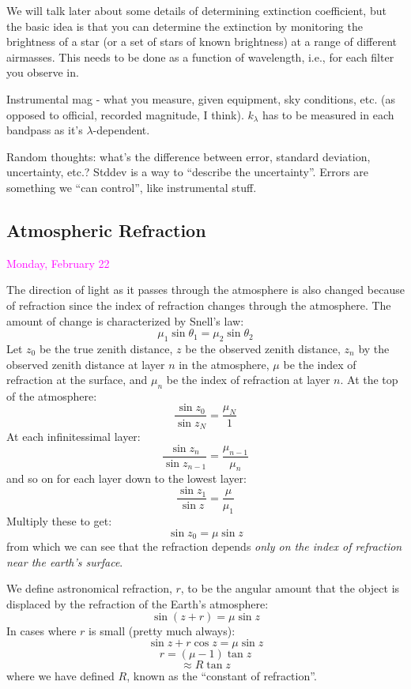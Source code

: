 \documentclass[12pt]{article}
\begin{document}
We will talk later about some details of determining extinction
coefficient, but the basic idea is that you can determine the
extinction by monitoring the brightness of a star (or a set of stars
of known brightness) at a range of different airmasses. This needs to
be done as a function of wavelength, i.e., for each filter you observe
in.

\textcolor{myBlue}{Instrumental mag - what you measure, given
    equipment, sky conditions, etc. (as opposed to official, recorded
    magnitude, I think). $k_{\lambda}$ has to be measured in each
    bandpass as it's $\lambda$-dependent.
}

\textcolor{myBlue}{Random thoughts: what's the difference between
    error, standard deviation, uncertainty, etc.?
    Stddev is a way to ``describe the uncertainty''. Errors are
    something we ``can control'', like instrumental stuff.
}

\subsection*{Atmospheric Refraction}
\textcolor{magenta}{Monday, February 22}

The direction of light as it passes through the atmosphere is also
changed because of refraction since the index of refraction changes
through the atmosphere. The amount of change is characterized by
Snell's law:
    $$ \mu_1\sin\theta_1 = \mu_2\sin\theta_2 $$
Let $z_0$ be the true zenith distance, $z$ be the observed zenith
distance, $z_n$ by the observed zenith distance at layer $n$ in the
atmosphere, $\mu$ be the index of refraction at the surface, and
$\mu_n$ be the index of refraction at layer $n$. At the top of the
atmosphere:
    $$ \frac{\sin z_0}{\sin z_N} = \frac{\mu_N}{1} $$
At each infinitessimal layer:
    $$ \frac{\sin z_n}{\sin z_{n-1}} = \frac{\mu_{n-1}}{\mu_n}  $$
and so on for each layer down to the lowest layer:
    $$ \frac{\sin z_1}{\sin z} = \frac{\mu}{\mu_1}  $$
Multiply these to get:
    $$ \sin z_0 = \mu\sin z  $$
from which we can see that the refraction depends
\emph{only on the index of refraction near the earth's surface}.

We define astronomical refraction, $r$, to be the angular amount that
the object is displaced by the refraction of the Earth's atmosphere:
    $$ \sin(z+r) = \mu\sin z $$
In cases where $r$ is small (pretty much always):
    $$ \sin z + r\cos z = \mu\sin z $$
    $$ r = (\mu-1) \tan z $$
    $$ \approx R\tan z $$
where we have defined $R$, known as the ``constant of refraction''.
\end{document}
